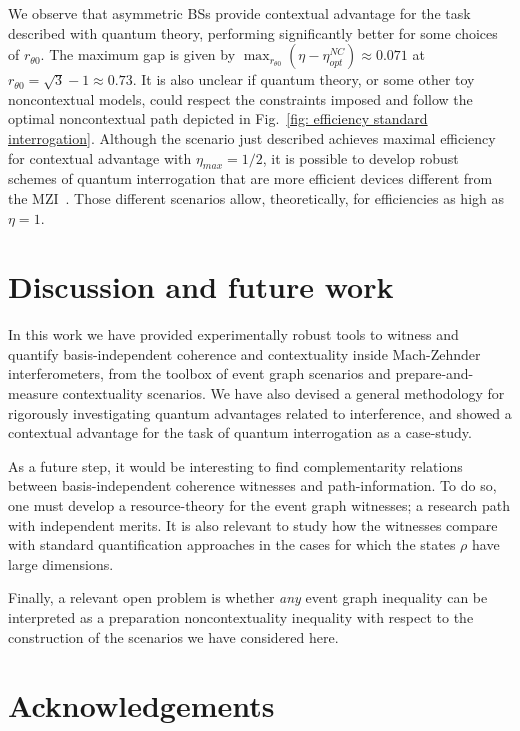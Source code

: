 \documentclass[letterpaper,onecolumn,12pt,accepted=2024-01-17]{article}
\begin{document}
We observe that asymmetric BSs provide contextual advantage for the task described with quantum theory, performing significantly better for some choices of $r_{\theta 0}$. The maximum gap is given by $\max_{r_{\theta 0}}(\eta - \eta_{opt}^{NC}) \approx 0.071$ at $r_{\theta 0} =\sqrt{3}-1 \approx 0.73$. It is also unclear if quantum theory, or some other toy noncontextual models, could respect the constraints imposed and follow the optimal noncontextual path depicted in Fig.~\ref{fig: efficiency standard interrogation}. Although the scenario just described achieves maximal efficiency for contextual advantage with $\eta_{max} = 1/2$, it is possible to develop robust schemes of quantum interrogation that are more efficient devices different from the MZI~\cite{kwiat1995interactionfree,kwiat1999high,rudolph2000better}. Those different scenarios allow, theoretically, for efficiencies as high as $\eta = 1$.






\section{Discussion and future work}

In this work we have provided experimentally robust tools to witness and quantify basis-independent coherence and contextuality inside Mach-Zehnder interferometers, from the toolbox of event graph scenarios and prepare-and-measure contextuality scenarios. We have also devised a general methodology for rigorously investigating quantum advantages related to interference, and showed a contextual advantage for the task of quantum interrogation as a case-study.

As a future step, it would be interesting to find complementarity relations between basis-independent coherence witnesses and path-information. To do so, one must develop a resource-theory for the event graph witnesses; a research path with independent merits. It is also relevant to study how the witnesses compare with standard quantification approaches in the cases for which the states $\rho$ have large dimensions. 

Finally, a relevant open problem is whether \textit{any} event graph inequality can be interpreted as a preparation noncontextuality inequality with respect to the construction of the scenarios we have considered here. 

\section{Acknowledgements}
\end{document}
